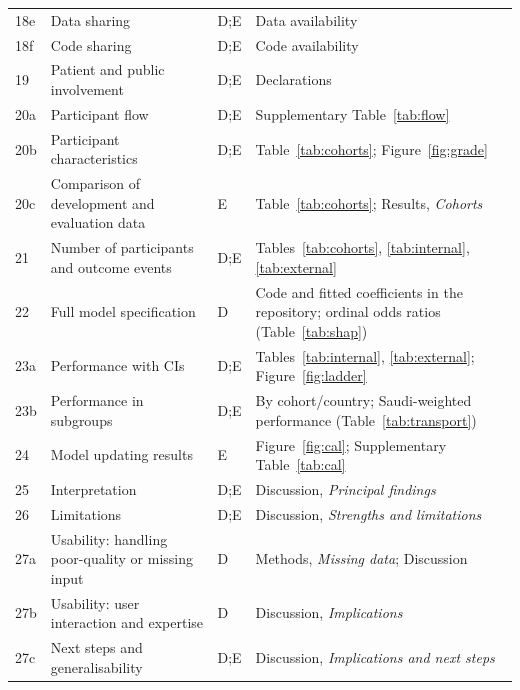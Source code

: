 \begin{longtable}{p{0.6cm}p{3.0cm}p{0.8cm}p{7.5cm}}
18e & Data sharing & D;E & Data availability \\
18f & Code sharing & D;E & Code availability \\
19 & Patient and public involvement & D;E & Declarations \\
20a & Participant flow & D;E & Supplementary Table~\ref{tab:flow} \\
20b & Participant characteristics & D;E & Table~\ref{tab:cohorts}; Figure~\ref{fig:grade} \\
20c & Comparison of development and evaluation data & E & Table~\ref{tab:cohorts}; Results, \emph{Cohorts} \\
21 & Number of participants and outcome events & D;E & Tables~\ref{tab:cohorts}, \ref{tab:internal}, \ref{tab:external} \\
22 & Full model specification & D & Code and fitted coefficients in the repository; ordinal odds ratios (Table~\ref{tab:shap}) \\
23a & Performance with CIs & D;E & Tables~\ref{tab:internal}, \ref{tab:external}; Figure~\ref{fig:ladder} \\
23b & Performance in subgroups & D;E & By cohort/country; Saudi-weighted performance (Table~\ref{tab:transport}) \\
24 & Model updating results & E & Figure~\ref{fig:cal}; Supplementary Table~\ref{tab:cal} \\
25 & Interpretation & D;E & Discussion, \emph{Principal findings} \\
26 & Limitations & D;E & Discussion, \emph{Strengths and limitations} \\
27a & Usability: handling poor-quality or missing input & D & Methods, \emph{Missing data}; Discussion \\
27b & Usability: user interaction and expertise & D & Discussion, \emph{Implications} \\
27c & Next steps and generalisability & D;E & Discussion, \emph{Implications and next steps} \\
\end{longtable}
